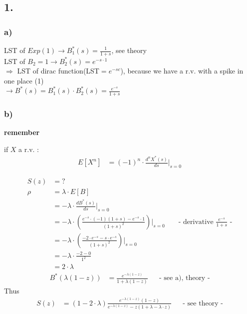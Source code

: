 \subsection*{ 1. }

\subsubsection*{ a) }

LST of $Exp \left(1\right)\rightarrow B_{1}^{{\ast }}\left(s\right)=\frac{1}{1+s}$, see theory\\
LST of $B_{2}=1\rightarrow B_{2}^{{\ast }}\left(s\right)=e^{{-s\cdot 1}}$\\
$\Rightarrow$ LST of dirac function(LST$=e^{-sc}$), because we have a r.v. with a spike in one place (1)\\
$\rightarrow B^{{\ast }}\left(s\right)=B_{1}^{{\ast }}\left(s\right)\cdot B_{2}^{{\ast }}\left(s\right)=\frac{e^{{-s}}}{1+s}$

\subsubsection*{ b) }

\textbf{remember}

if $X$ a r.v. :
\begin{align*}
E\left[X^{n}\right]&=\left(-1\right)^{n}\cdot \frac{d^{n}X^{{\ast }}\left(s\right)}{ds}\bigg\rvert_{{s=0}}
\end{align*}

\begin{align*}
S\left(z\right)&=?\\
\rho &=\lambda \cdot E\left[B\right]\\
&=-\lambda \cdot \frac{dB^{{\ast }}\left(s\right)}{ds}\bigg\rvert _{{s=0}}\\
&=-\lambda \cdot \left(\frac{e^{{-s}}\cdot \left(-1\right)\left(1+s\right)-e^{{-s}}\cdot 1}{\left(1+s\right)^{2}}\right)\bigg\rvert _{{s=0}} && \text{ - derivative $\frac{e^{{-s}}}{1+s}$ -}\\
&=-\lambda \cdot \left(\frac{-2\cdot e^{{-s}}-s\cdot e^{{-s}}}{\left(1+s\right)^{2}}\right)\bigg\rvert _{{s=0}}\\
&=-\lambda \cdot \frac{-2-0}{1^{2}}\\
&=2\cdot \lambda 
\end{align*}
\begin{align*}
B^{{\ast }} \left(\lambda \left(1-z\right)\right)&=\frac{e^{{-\lambda \left(1-z\right)}}}{1+\lambda \left(1-z\right)} && \text{- see  a), theory -}
\end{align*}
Thus
\begin{align*}
S\left(z\right)&=\left(1-2\cdot \lambda \right)\frac{e^{{-\lambda \left(1-z\right)}}\left(1-z\right)}{e^{{-\lambda \left(1-z\right)}}-z\left(1+\lambda -\lambda \cdot z\right)} && \text{- see theory -}
\end{align*}

